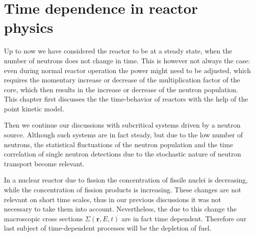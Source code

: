 % 
%
% 
%
%
%
%
%

\section{Time dependence in reactor physics}

Up to now we have considered the reactor to be at a steady state, when the number of neutrons does not change in time. This is however not always the case: even during normal reactor operation the power might need to be adjusted, which requires the momentary increase or decrease of the multiplication factor of the core, which then results in the increase or decrease of the neutron population. This chapter first discusses the the time-behavior of reactors with the help of the point kinetic model.

Then we continue our discussions with subcritical systems driven by a neutron source. Although such systems are in fact steady, but due to the low number of neutrons, the statistical fluctuations of the neutron population and the time correlation of single neutron detections due to the stochastic nature of neutron transport become relevant. 

In a nuclear reactor due to fission the concentration of fissile nuclei is decreasing, while the concentration of fission products is increasing. These changes are not relevant on short time scales, thus in our previous discussions it was not necessary to take them into account. Nevertheless, the due to this change the macroscopic cross sections $\Sigma(\mathbf{r},E,t)$ are in fact time dependent. Therefore our last subject of time-dependent processes will be the depletion of fuel.

